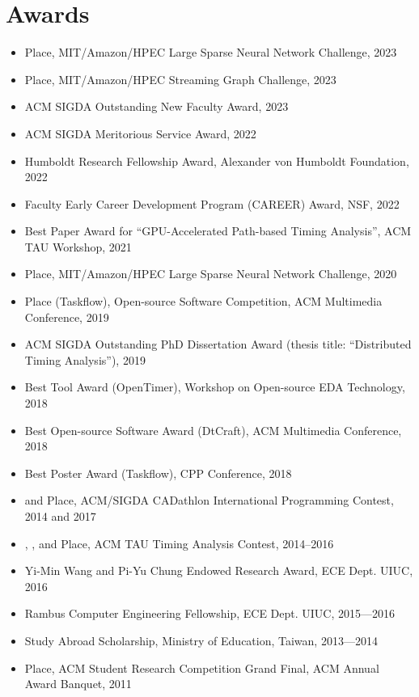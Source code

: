 \documentclass[A4,11pt]{article}
\begin{document}
\section{Awards}
 \begin{itemize}
 \itemsep-3pt
    \item {} Place, MIT/Amazon/HPEC Large Sparse Neural Network Challenge, 2023
    \item {} Place, MIT/Amazon/HPEC Streaming Graph Challenge, 2023
    \item ACM SIGDA Outstanding New Faculty Award, 2023
    \item ACM SIGDA Meritorious Service Award, 2022
    \item Humboldt Research Fellowship Award, Alexander von Humboldt Foundation, 2022
    \item Faculty Early Career Development Program (CAREER) Award, NSF, 2022
    \item Best Paper Award for ``GPU-Accelerated Path-based Timing Analysis'', ACM TAU Workshop, 2021
    \item {} Place, MIT/Amazon/HPEC Large Sparse Neural Network Challenge, 2020
    \item {} Place (Taskflow), Open-source Software Competition, ACM Multimedia Conference, 2019
    \item ACM SIGDA Outstanding PhD Dissertation Award (thesis title: ``Distributed Timing Analysis''), 2019
    \item Best Tool Award (OpenTimer), Workshop on Open-source EDA Technology, 2018
    \item Best Open-source Software Award (DtCraft), ACM Multimedia Conference, 2018
    \item Best Poster Award (Taskflow), CPP Conference, 2018
    \item {} and  Place, ACM/SIGDA CADathlon International Programming Contest, 2014 and 2017
    \item {}, , and  Place, ACM TAU Timing Analysis Contest, 2014--2016
    \item Yi-Min Wang and Pi-Yu Chung Endowed Research Award, ECE Dept. UIUC, 2016
    \item Rambus Computer Engineering Fellowship, ECE Dept. UIUC, 2015—2016
    \item Study Abroad Scholarship, Ministry of Education, Taiwan, 2013—2014
    \item {} Place, ACM Student Research Competition Grand Final, ACM Annual Award Banquet, 2011

\end{itemize}
\end{document}
